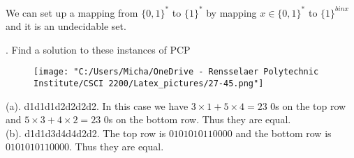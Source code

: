 \documentclass{article}
\begin{document}
We can set up a mapping from $\{0,1\}^*$ to $\{1\}^*$ by mapping $x \in \{0,1\}^*$ to $\{1\}^{binx}$ and it is an undecidable set.

\clearpage

. Find a solution to these instances of PCP
\begin{center}
	\begin{figure}[h]
		\texttt{[image: "C:/Users/Micha/OneDrive - Rensselaer Polytechnic Institute/CSCI 2200/Latex\_pictures/27-45.png"]}\\
	\end{figure}
\end{center}
(a). d1d1d1d2d2d2d2. In this case we have $3 \times 1 + 5 \times 4 = 23$ 0s on the top row and $5 \times 3 + 4 \times 2 = 23$ 0s on the bottom row. Thus they are equal.\\
(b). d1d1d3d4d4d2d2. The top row is $0101010110000$ and the bottom row is $0101010110000$. Thus they are equal.
\end{document}

